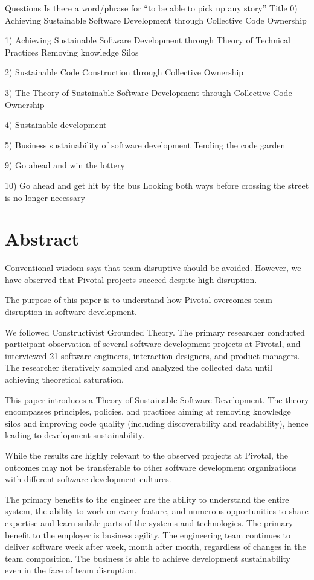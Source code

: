 Questions
Is there a word/phrase for “to be able to pick up any story” 
Title
0) Achieving Sustainable Software Development through Collective Code Ownership 

1) Achieving Sustainable Software Development through Theory of {Technical Practices}
Removing knowledge Silos

2) Sustainable Code Construction through Collective Ownership

3) The Theory of Sustainable Software Development through Collective Code Ownership

4) Sustainable development 

5)  Business sustainability of software development
Tending the code garden

9) Go ahead and win the lottery

10) Go ahead and get hit by the bus
Looking both ways before crossing the street is no longer necessary

\section {Abstract}
 Conventional wisdom says that team disruptive should be avoided. However, we have observed that Pivotal projects succeed despite high disruption.  

 The purpose of this paper is to understand how Pivotal overcomes team disruption in software development.

 We followed Constructivist Grounded Theory. The primary researcher conducted participant-observation of several software development projects at Pivotal, and interviewed 21 software engineers, interaction designers, and product managers. The researcher iteratively sampled and analyzed the collected data until achieving theoretical saturation.

 This paper introduces a Theory of Sustainable Software Development. The theory encompasses principles, policies, and practices aiming at removing knowledge silos and improving code quality (including discoverability and readability), hence leading to development sustainability. 

 While the results are highly relevant to the observed projects at Pivotal, the outcomes may not be transferable to other software development organizations with different software development cultures.

  The primary benefits to the engineer are the ability to understand the entire system, the ability to work on every feature, and numerous opportunities to share expertise and learn subtle parts of the systems and technologies. The primary benefit to the employer is business agility. The engineering team continues to deliver software week after week, month after month, regardless of changes in the team composition. The business is able to achieve development sustainability even in the face of team disruption.

